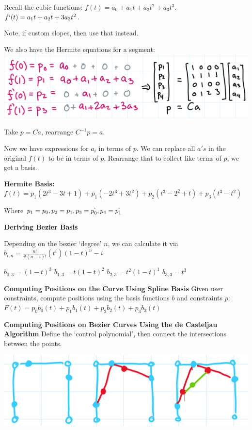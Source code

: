 \documentclass[letterpaper, 8pt]{extarticle}
\begin{document}
\begin{multicols*}{4}
    Recall the cubic functions:
    $f(t) = a_0 + a_1t + a_2t^2 + a_3t^3$.
    $f`(t) = a_1t + a_2t + 3a_3t^2$.

    Note, if custom slopes, then use that instead.

    We also have the Hermite equations for a segment:
    \includegraphics[width=0.8\linewidth]{
        curve-basis-soe.png}

    Take $p=Ca$, rearrange $C^{-1}p=a$.

    Now we have expressions for $a_i$ in terms of $p$. We can replace all $a's$ in the original $f(t)$ to be in terms of $p$. Rearrange that to collect like terms of $p$, we get a basis.


    \textbf{Hermite Basis:}
    $f(t) = p_1(2t^3 - 3t + 1) + p_1(-2t^3+3t^2) + p_2(t^3-2^2 + t) + p_3(t^3-t^2)$

    Where $p_1 = p_0, p_2 = p_1, p_3 = p^`_0, p_4 = p^`_1$

    \textbf{Deriving Bezier Basis}

    Depending on the bezier `degree' $n$, we can calculate it via $b_{i,n} = \frac{n!}{i!(n-i)!}(t^i)(1-t)^n-i$.

    $b_{0,3} = (1-t)^3$
    $b_{1,3} = t(1-t)^2$
    $b_{2,3} = t^2(1-t)^1$
    $b_{3,3} = t^3$


    \textbf{Computing Positions on the Curve Using Spline Basis}
    Given user constraints, compute positions using the basis functions $b$ and constraints $p$: $F(t) = p_0b_0(t) + p_1b_1(t) + p_2b_2(t) + p_3b_3(t)$

    \textbf{Computing Positions on Bezier Curves Using the de Casteljau Algorithm}
    Define the `control polynomial', then connect the intersections between the points.

    \includegraphics[width=0.5\linewidth]{bezier.png}


\end{multicols*}
\end{document}
